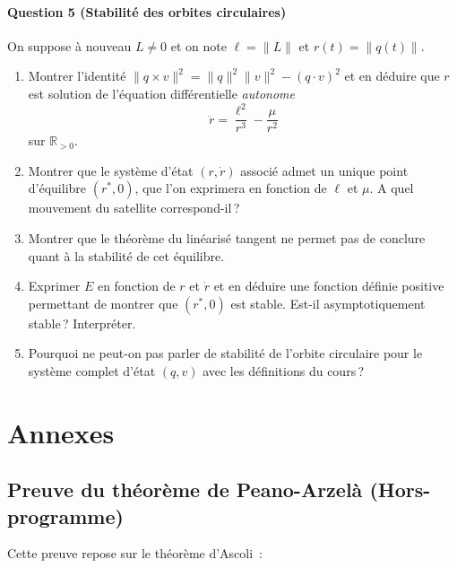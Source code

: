\hypertarget{kepler-5}{%
\subsubsection*{Question 5 (Stabilité des orbites
circulaires)}\label{kepler-5}}


On suppose à nouveau \(L\neq 0\) et on note \(\ell=\|L\|\) et
\(r(t)=\|q(t)\|\).

\begin{enumerate}
\def\labelenumi{\alph{enumi})}
\tightlist
\item
  Montrer l'identité \(\|q\times v\|^2 = \|q\|^2\|v\|^2 - (q\cdot v)^2\)
  et en déduire que \(r\) est solution de l'équation différentielle
  \emph{autonome} \[
  \ddot{r} = \frac{\ell^2}{r^3} - \frac{\mu}{r^2}
  \] sur \(\mathbb{R}_{>0}\).
\item
  Montrer que le système d'état \((r,\dot r)\) associé admet un unique
  point d'équilibre \((r^*,0)\), que l'on exprimera en fonction de
  \(\ell\) et \(\mu\). A quel mouvement du satellite correspond-il\,?
\item
  Montrer que le théorème du linéarisé tangent ne permet pas de conclure
  quant à la stabilité de cet équilibre.
\item
  Exprimer \(E\) en fonction de \(r\) et \(\dot r\) et en déduire une
  fonction définie positive permettant de montrer que \((r^*,0)\) est
  stable. Est-il asymptotiquement stable\,? Interpréter.
\item
  Pourquoi ne peut-on pas parler de stabilité de l'orbite circulaire
  pour le système complet d'état \((q,v)\) avec les définitions du
  cours\,?
\end{enumerate}

\hypertarget{annexes}{%
\chapter{Annexes}\label{annexes}}

\hypertarget{app_peano}{%
\section{Preuve du théorème de Peano-Arzelà
(Hors-programme)}\label{app_peano}}

Cette preuve repose sur le théorème d'Ascoli~:

